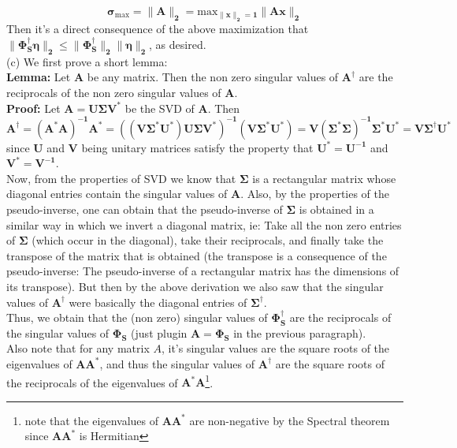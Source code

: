 \documentclass[a4paper,11pt]{article}
\numberwithin{definition}{section}
\numberwithin{mytheorem}{subsection}
\begin{document}
$$\boldsymbol{\sigma_{\mathrm{max}} = \lVert A\rVert_2 = \mathrm{max}_{\lVert x\rVert_2 = 1}\lVert Ax\rVert_2}$$
Then it's a direct consequence of the above maximization that $\boldsymbol{\lVert\Phi_S^{\dagger}\eta\rVert_2 \leq \lVert\Phi_S^{\dagger}\rVert_2\lVert\eta\rVert_2}$, as desired.
\\
(c) We first prove a short lemma:\\
\textbf{Lemma: } Let $\boldsymbol{A}$ be any matrix. Then the non zero singular values of $\boldsymbol{A^{\dagger}}$ are the reciprocals of the non zero singular values of $\boldsymbol{A}$.\\
\textbf{Proof: } Let $\boldsymbol{A = U\Sigma V^*}$ be the SVD of $\boldsymbol{A}$. Then 
$$\boldsymbol{A^{\dagger} = (A^*A)^{-1}A^* = ((V\Sigma^*U^*)U\Sigma V^*)^{-1}(V\Sigma^*U^*) = V(\Sigma^*\Sigma)^{-1}\Sigma^*U^* = V\Sigma^{\dagger}U^*}$$
since $\boldsymbol{U}$ and $\boldsymbol{V}$ being unitary matrices satisfy the property that $\boldsymbol{U^* = U^{-1}}$ and $\boldsymbol{V^* = V^{-1}}$.\\
Now, from the properties of SVD we know that $\boldsymbol{\Sigma}$ is a rectangular matrix whose diagonal entries contain the singular values of $\boldsymbol{A}$. Also, by the properties of the pseudo-inverse, one can obtain that the pseudo-inverse of $\boldsymbol{\Sigma}$ is obtained in a similar way in which we invert a diagonal matrix, ie: Take all the non zero entries of $\boldsymbol{\Sigma}$ (which occur in the diagonal), take their reciprocals, and finally take the transpose of the matrix that is obtained (the transpose is a consequence of the pseudo-inverse: The pseudo-inverse of a rectangular matrix has the dimensions of its transpose). But then by the above derivation we also saw that the singular values of $\boldsymbol{A^{\dagger}}$ were basically the diagonal entries of $\boldsymbol{\Sigma^{\dagger}}$. \\
Thus, we obtain that the (non zero) singular values of $\boldsymbol{\Phi_S^{\dagger}}$ are the reciprocals of the singular values of $\boldsymbol{\Phi_S}$ (just plugin $\boldsymbol{A = \Phi_S}$ in the previous paragraph).\\
Also note that for any matrix $A$, it's singular values are the square roots of the eigenvalues of $\boldsymbol{AA^*}$, and thus the singular values of $\boldsymbol{A^{\dagger}}$ are the square roots of the reciprocals of the eigenvalues of $\boldsymbol{A^*A}$\footnote{note that the eigenvalues of $\boldsymbol{AA^*}$ are non-negative by the Spectral theorem since $\boldsymbol{AA^*}$ is Hermitian}.\\
\end{document}
